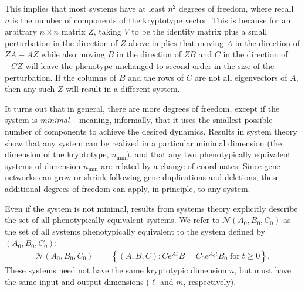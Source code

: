\documentclass{article}
\newcommand{\1}{\mathbbm{1}}
\newcommand{\Sys}{\mathcal{S}}
\newcommand{\allS}{\mathcal{N}}
\begin{document}
This implies that most systems have at least $n^2$ degrees of freedom,
where recall $n$ is the number of components of the kryptotype vector.
This is because for an arbitrary $n \times n$ matrix $Z$,
taking $V$ to be the identity matrix plus a small perturbation in the direction of $Z$
above implies that
moving $A$ in the direction of $ZA - AZ$
while also moving $B$ in the direction of $ZB$ 
and $C$ in the direction of $-CZ$
will leave the phenotype unchanged to second order in the size of the perturbation.
If the columns of $B$ and the rows of $C$ are not all eigenvectors of $A$,
then any such $Z$ will result in a different system.

It turns out that in general, there are more degrees of freedom,
except if the system is \emph{minimal} -- meaning, informally, that it uses the smallest possible number of components
to achieve the desired dynamics.
Results in system theory show that any system can be realized in a particular minimal dimension
(the dimension of the kryptotype, $n_\text{min}$),
and that any two phenotypically equivalent systems of dimension $n_\text{min}$ are related by a change of coordinates.
Since gene networks can grow or shrink following gene duplications and deletions, 
these additional degrees of freedom can apply, in principle, to any system.

Even if the system is not minimal, results from systems theory %
explicitly describe the set of all phenotypically equivalent systems.
We refer to $\allS(A_0,B_0,C_0)$ as the set of all systems phenotypically equivalent
to the system defined by $(A_0, B_0, C_0)$:
\begin{equation} \label{eqn:equivalence}
  \begin{aligned}
    \allS(A_0, B_0, C_0) 
      &= \left\{
        (A,B,C) : C e^{At} B = C_0 e^{A_0 t} B_0 \; \text{for}\; t \ge 0 
      \right\}  .
  \end{aligned}
\end{equation}
These systems need not have the same kryptotypic dimension $n$,
but must have the same input and output dimensions ($\ell$ and $m$, respectively).
\end{document}
